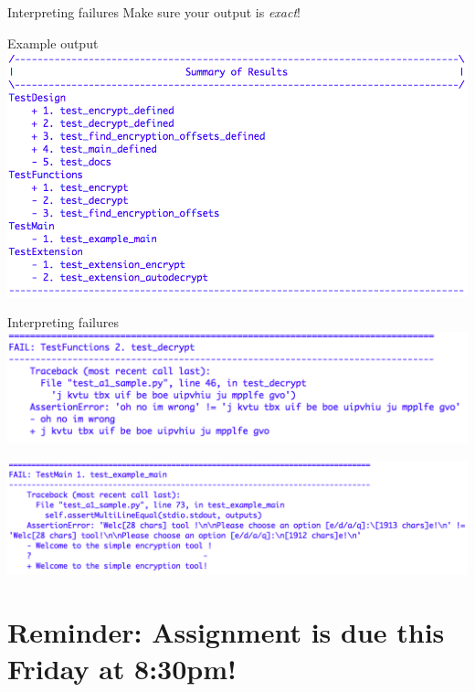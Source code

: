\documentclass[week2]{csse1001}
\begin{document}
\begin{topic}{Interpreting failures}
Make sure your output is \textit{exact}!

\begin{topic}{Example output}
\includegraphics[height=0.9\textheight]{testsa1/overview}
\end{topic}

\begin{topic}{Interpreting failures}
\includegraphics[height=0.9\textheight]{testsa1/fail}
\end{topic}


\includegraphics[height=0.8\textheight]{testsa1/fail2}
\end{topic}

\section{Reminder: Assignment is due this Friday at 8:30pm!}
\end{document}
